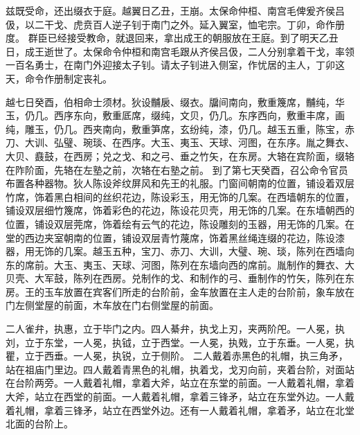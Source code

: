 \documentclass[a4paper,12pt,UTF8,twoside]{ctexbook}
\begin{document}
兹既受命，还出缀衣于庭。越翼日乙丑，王崩。太保命仲桓、南宫毛俾爰齐侯吕伋，以二干戈、虎贲百人逆子钊于南门之外。延入翼室，恤宅宗。丁卯，命作册度。
群臣已经接受教命，就退回来，拿出成王的朝服放在王庭。到了明天乙丑日，成王逝世了。太保命令仲桓和南宫毛跟从齐侯吕伋，二人分别拿着干戈，率领一百名勇士，在南门外迎接太子钊。请太子钊进入侧室，作忧居的主人，丁卯这天，命令作册制定丧礼。

越七日癸酉，伯相命士须材。狄设黼扆、缀衣。牖间南向，敷重篾席，黼纯，华玉，仍几。西序东向，敷重厎席，缀纯，文贝，仍几。东序西向，敷重丰席，画纯，雕玉，仍几。西夹南向，敷重笋席，玄纷纯，漆，仍几。越玉五重，陈宝，赤刀、大训、弘璧、琬琰、在西序。大玉、夷玉、天球、河图，在东序。胤之舞衣、大贝、鼖鼓，在西房；兑之戈、和之弓、垂之竹矢，在东房。大辂在宾阶面，缀辂在阼阶面，先辂在左塾之前，次辂在右塾之前。
到了第七天癸酉，召公命令官员布置各种器物。狄人陈设斧纹屏风和先王的礼服。门窗间朝南的位置，铺设着双层竹席，饰着黑白相间的丝织花边，陈设彩玉，用无饰的几案。在西墙朝东的位置，铺设双层细竹篾席，饰着彩色的花边，陈设花贝壳，用无饰的几案。在东墙朝西的位置，铺设双层莞席，饰着绘有云气的花边，陈设雕刻的玉器，用无饰的几案。在堂的西边夹室朝南的位置，铺设双层青竹蔑席，饰着黑丝绳连缀的花边，陈设漆器，用无饰的几案。越玉五种，宝刀、赤刀、大训，大璧、琬、琰，陈列在西墙向东的席前。大玉、夷玉、天球、河图，陈列在东墙向西的席前。胤制作的舞衣、大贝壳、大军鼓，陈列在西房。兑制作的戈、和制作的弓、垂制作的竹矢，陈列在东房。王的玉车放置在宾客们所走的台阶前，金车放置在主人走的台阶前，象车放在门左侧堂屋的前面，木车放在门右侧堂屋的前面。

二人雀弁，执惠，立于毕门之内。四人綦弁，执戈上刃，夹两阶戺。一人冕，执刘，立于东堂，一人冕，执钺，立于西堂。一人冕，执戣，立于东垂。一人冕，执瞿，立于西垂。一人冕，执锐，立于侧阶。
二人戴着赤黑色的礼帽，执三角矛，站在祖庙门里边。四人戴着青黑色的礼帽，执着戈，戈刃向前，夹着台阶，对面站在台阶两旁。一人戴着礼帽，拿着大斧，站立在东堂的前面。一人戴着礼帽，拿着大斧，站立在西堂的前面。一人戴着礼帽，拿着三锋矛，站立在东堂外边。一人戴着礼帽，拿着三锋矛，站立在西堂外边。还有一人戴着礼帽，拿着矛，站立在北堂北面的台阶上。
\end{document}
